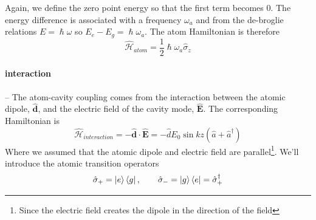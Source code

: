 Again, we define the zero point energy so that the first term becomes $0$. The energy difference is associated with a frequency $\omega_a$ and from the de-broglie relations $E = \hslash\omega$ so $E_e - E_g = \hslash\omega_a$. The atom Hamiltonian is therefore
\begin{equation}
    \boxed{\hat{\mathcal{H}}_{\textit{atom}} = \frac{1}{2}\hslash\omega_a\hat{\sigma}_z}
\end{equation}

\paragraph*{interaction}--\quad
The atom-cavity coupling comes from the interaction between the atomic dipole, $\hat{\textbf{d}}$, and the electric field of the cavity mode, $\hat{\mathbf{E}}$. The corresponding Hamiltonian is
\[
\hat{\mathcal{H}}_{\textit{interaction}} = -\hat{\mathbf{d}}\cdot\hat{\mathbf{E}} = -\hat{d} E_0 \sin{kz} (\hat{a} + \hat{a}^\dag{})
\]
Where we assumed that the atomic dipole and electric field are parallel\footnote{Since the electric field creates the dipole in the direction of the field}.
We'll introduce the atomic transition operators
\[
    \hat{\sigma}_+ = \ket{e}\bra{g}, \quad\quad \hat{\sigma}_- = \ket{g}\bra{e} = \hat{\sigma}_+^{\dag{}}
\]

